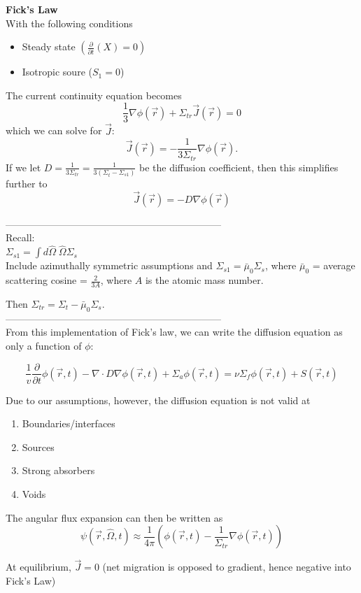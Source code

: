 \documentclass{report}
\newcommand{\p}{\partial}
\newcommand{\ppt}{\frac{\p}{\p t}}
\newcommand{\Xs}{\Sigma}
\newcommand{\Oov}{\frac{1}{v}}
\newcommand{\pos}{\vec{r}}
\newcommand{\cur}{\vec{J}}
\newcommand{\Oh}{\hat{\Omega}}
\newcommand{\rt}{(\pos,t)}
\newcommand{\rOt}{(\pos,\Oh,t)}
\begin{document}
\textbf{Fick's Law}\\

With the following conditions
\begin{itemize}
    \item Steady state $(\ppt(X) = 0)$
    \item Isotropic soure ($S_1 = 0$)
\end{itemize}

The current continuity equation becomes
$$\frac{1}{3} \nabla \phi(\pos) + \Xs_{tr} \cur(\pos) = 0$$
which we can solve for $\cur$:
$$\cur(\pos) = -\frac{1}{3\Xs_{tr}} \nabla \phi(\pos).$$
If we let $D = \frac{1}{3\Xs_{tr}} = \frac{1}{3(\Xs_t-\Xs_{s1})}$ be the diffusion coefficient, then this simplifies further to
$$\cur(\pos) = -D \nabla \phi(\pos)$$

------------------------------------------------------------------\\
Recall:\\
$\Xs_{s1} = \int d\Oh \; \Oh \Xs_{s}$\\
Include azimuthally symmetric assumptions and $\Xs_{s1} = \bar{\mu}_0 \Xs_s$, where $\bar{\mu}_0$ = average scattering cosine = $\frac{2}{3A}$, where $A$ is the atomic mass number.

Then $\Xs_{tr} = \Xs_t - \bar{\mu}_0 \Xs_s$.\\
------------------------------------------------------------------\\

From this implementation of Fick's law, we can write the diffusion equation as only a function of $\phi$:

$$\Oov \ppt \phi\rt - \nabla \cdot D \nabla \phi\rt + \Xs_a \phi\rt = \nu\Xs_f \phi\rt + S\rt$$

Due to our assumptions, however, the diffusion equation is not valid at 
\begin{enumerate}
    \item Boundaries/interfaces
    \item Sources
    \item Strong absorbers
    \item Voids
\end{enumerate}

The angular flux expansion can then be written as 
$$\psi\rOt \approx \frac{1}{4\pi}\left( \phi\rt - \frac{1}{\Xs_{tr}} \nabla \phi\rt \right)$$

At equilibrium, $\cur = 0$ (net migration is opposed to gradient, hence negative into Fick's Law)
\end{document}
